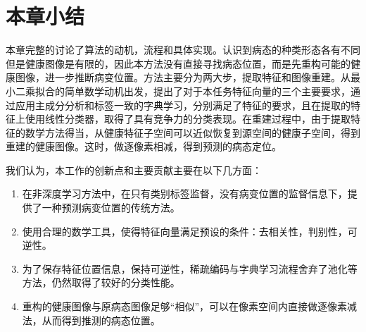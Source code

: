     \section{本章小结}
    本章完整的讨论了算法的动机，流程和具体实现。认识到病态的种类形态各有不同但是健康图像是有限的，因此本方法没有直接寻找病态位置，而是先重构可能的健康图像，进一步推断病变位置。方法主要分为两大步，提取特征和图像重建。从最小二乘拟合的简单数学动机出发，提出了对于本任务特征向量的三个主要要求，通过应用主成分分析和标签一致的字典学习，分别满足了特征的要求，且在提取的特征上使用线性分类器，取得了具有竞争力的分类表现。在重建过程中，由于提取特征的数学方法得当，从健康特征子空间可以近似恢复到源空间的健康子空间，得到重建的健康图像。这时，做逐像素相减，得到预测的病态定位。

    我们认为，本工作的创新点和主要贡献主要在以下几方面：
    \begin{enumerate}
        \item 在非深度学习方法中，在只有类别标签监督，没有病变位置的监督信息下，提供了一种预测病变位置的传统方法。
        \item 使用合理的数学工具，使得特征向量满足预设的条件：去相关性，判别性，可逆性。
        \item 为了保存特征位置信息，保持可逆性，稀疏编码与字典学习流程舍弃了池化等方法，仍然取得了较好的分类性能。
        \item 重构的健康图像与原病态图像足够“相似”，可以在像素空间内直接做逐像素减法，从而得到推测的病态位置。
    \end{enumerate}





